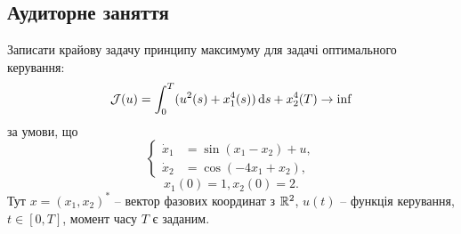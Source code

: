 \subsection{Аудиторне заняття}

\begin{problem}
    Записати крайову задачу принципу максимуму для задачі оптимального керування:
    \begin{equation*}
        \mathcal{J}(u) = \int_0^T (u^2(s) + x_1^4(s)) \mathop{}\!\mathrm{d} s + x_2^4(T) \to \inf
    \end{equation*}
    за умови, що
    \[ \left\{ \begin{aligned}
        \dot x_1 &= \sin(x_1 - x_2) + u, \\
        \dot x_2 &= \cos(-4x_1 + x_2),
    \end{aligned} \right. \]
    \begin{equation*}
        x_1(0) = 1, x_2(0) = 2.
    \end{equation*}
    Тут $x = (x_1, x_2)^*$ -- вектор фазових координат з $\mathbb{R}^2$, $u(t)$ -- функція керування, $t \in [0, T]$, момент часу $T$ є заданим.
\end{problem}

